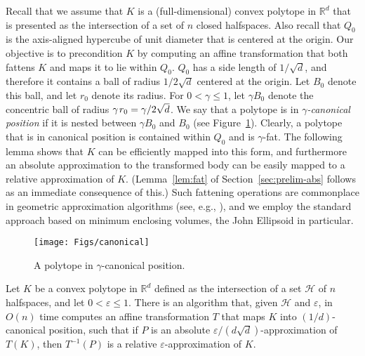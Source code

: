 \documentclass[11pt]{article}   \usepackage[letterpaper,hmargin=2.1cm,vmargin=3cm]{geometry}
\newcommand{\RE}{\mathbb{R}}    \newcommand{\ZZ}{\mathbb{Z}}    \newcommand{\eps}{\varepsilon}  \newcommand{\ST}{\,:\,}         \newcommand{\sq}{\square}
\renewcommand{\P}{\kern+1pt}    \newcommand{\N}{\kern-2pt}      \newcommand{\NN}{\kern-4pt}     \newcommand{\polar}[1]{\mathrm{polar}(#1)}            \newcommand{\polarX}[2]{\mathrm{polar}_{#1}(#2)}
\begin{document}
Recall that we assume that $K$ is a (full-dimensional) convex polytope in $\RE^d$ that is presented as the intersection of a set of $n$ closed halfspaces. Also recall that $Q_0$ is the axis-aligned hypercube of unit diameter that is centered at the origin. Our objective is to precondition $K$ by computing an affine transformation that both fattens $K$ and maps it to lie within $Q_0$. $Q_0$ has a side length of $1/\sqrt{d}$, and therefore it contains a ball of radius $1/2\sqrt{d}$ centered at the origin. Let $B_0$ denote this ball, and let $r_0$ denote its radius. For $0 < \gamma \le 1$, let $\gamma B_0$ denote the concentric ball of radius $\gamma \P r_0 = \gamma/2\sqrt{d}$. We say that a polytope is in \emph{$\gamma$-canonical position} if it is nested between $\gamma B_0$ and $B_0$ (see Figure~\ref{fig:canonical}). Clearly, a polytope that is in canonical position is contained within $Q_0$ and is $\gamma$-fat. The following lemma shows that $K$ can be efficiently mapped into this form, and furthermore an absolute approximation to the transformed body can be easily mapped to a relative approximation of $K$. (Lemma~\ref{lem:fat} of Section~\ref{sec:prelim-abs} follows as an immediate consequence of this.) Such fattening operations are commonplace in geometric approximation algorithms (see, e.g., \cite{AHV-coreset,Chan-coreset,HP-book,BHP-bbox}), and we employ the standard approach based on minimum enclosing volumes, the John Ellipsoid in particular. 

\begin{figure}[htbp]
  \centerline{\texttt{[image: Figs/canonical]}}
  \caption{A polytope in $\gamma$-canonical position.}
  \label{fig:canonical}
\end{figure}


\begin{lemma} \label{lem:precondition-1}
Let $K$ be a convex polytope in $\RE^d$ defined as the intersection of a set $\mathcal{H}$ of $n$ halfspaces, and let $0 < \eps \le 1$. There is an algorithm that, given $\mathcal{H}$ and $\eps$, in $O(n)$ time computes an affine transformation $T$ that maps $K$ into $(1/d)$-canonical position, such that if $P$ is an absolute $\eps/(d \sqrt{d})$-approximation of $T(K)$, then $T^{-1}(P)$ is a relative $\eps$-approximation of $K$.
\end{lemma}
\end{document}
